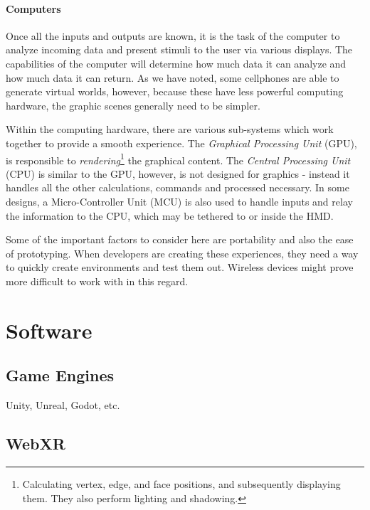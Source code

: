 \paragraph{Computers}

Once all the inputs and outputs are known, it is the task of the computer to analyze incoming data and present stimuli to the user via various displays. The capabilities of the computer will determine how much data it can analyze and how much data it can return. As we have noted, some cellphones are able to generate virtual worlds, however, because these have less powerful computing hardware, the graphic scenes generally need to be simpler. 

Within the computing hardware, there are various sub-systems which work together to provide a smooth experience. The \textit{Graphical Processing Unit} (GPU), is responsible to \textit{rendering}\footnote{Calculating vertex, edge, and face positions, and subsequently displaying them. They also perform lighting and shadowing.} the graphical content. The \textit{Central Processing Unit} (CPU) is similar to the GPU, however, is not designed for graphics - instead it handles all the other calculations, commands and processed necessary. In some designs, a Micro-Controller Unit (MCU) is also used to handle inputs and relay the information to the CPU, which may be tethered to or inside the HMD.

Some of the important factors to consider here are portability and also the ease of prototyping. When developers are creating these experiences, they need a way to quickly create environments and test them out. Wireless devices might prove more difficult to work with in this regard.  

\section{Software}




\subsection{Game Engines}
Unity, Unreal, Godot, etc.

\subsection{WebXR}


